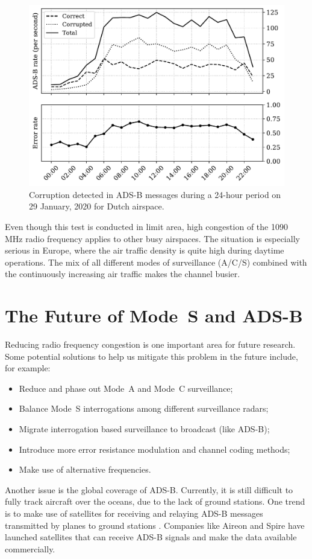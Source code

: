 \begin{figure}[ht]
    \centering
    \includegraphics[width=0.7\columnwidth]{figures/conclusion/adsb_corruption.pdf}
    \caption{Corruption detected in ADS-B messages during a 24-hour period on 29
    January, 2020 for Dutch airspace.}
    \label{fig:adsb_corruption}
\end{figure}

Even though this test is conducted in limit area, high congestion of the 1090 MHz radio frequency applies to other busy airspaces. The situation is especially serious in Europe, where the air traffic density is quite high during daytime operations. The mix of all different modes of surveillance (A/C/S) combined with the continuously increasing air traffic makes the channel busier.  

\section{The Future of Mode~S and ADS-B}
Reducing radio frequency congestion is one important area for future research. Some potential solutions to help us mitigate this problem in the future include, for example:

\begin{itemize}
    \item Reduce and phase out Mode~A and Mode~C surveillance;
    \item Balance Mode~S interrogations among different surveillance radars;
    \item Migrate interrogation based surveillance to broadcast (like ADS-B);
    \item Introduce more error resistance modulation and channel coding methods;
    \item Make use of alternative frequencies.
\end{itemize}

Another issue is the global coverage of ADS-B. Currently, it is still difficult to fully track aircraft over the oceans, due to the lack of ground stations. One trend is to make use of satellites for receiving and relaying ADS-B messages transmitted by planes to ground stations \cite{noschese2011}. Companies like Aireon and Spire have launched satellites that can receive ADS-B signals and make the data available commercially. 

